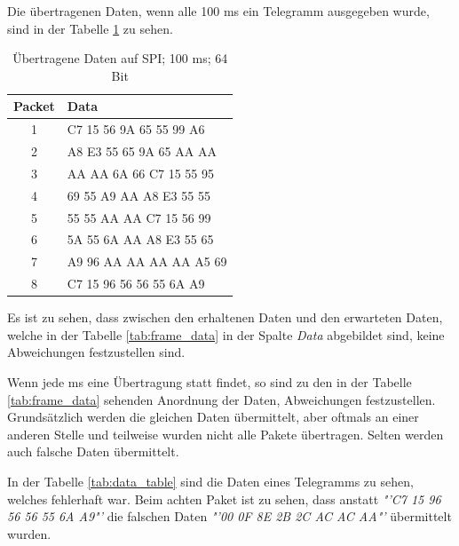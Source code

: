 Die übertragenen Daten, wenn alle 100 ms ein Telegramm ausgegeben wurde, sind in der Tabelle \ref{tab:packet_data_2cols} zu sehen. 

\begin{table}[H]
    \centering
    \begin{tabular}{c||l}
        \toprule
        \textbf{Packet} & \textbf{Data} \\ 
        \midrule
        1 & C7 15 56 9A 65 55 99 A6 \\
        2 & A8 E3 55 65 9A 65 AA AA \\
        3 & AA AA 6A 66 C7 15 55 95 \\
        4 & 69 55 A9 AA A8 E3 55 55 \\
        5 & 55 55 AA AA C7 15 56 99 \\
        6 & 5A 55 6A AA A8 E3 55 65 \\
        7 & A9 96 AA AA AA AA A5 69 \\
        8 & C7 15 96 56 56 55 6A A9 \\
        \bottomrule
    \end{tabular}
    \caption{Übertragene Daten auf SPI; 100 ms; 64 Bit}
    \label{tab:packet_data_2cols}
\end{table}

Es ist zu sehen, dass zwischen den erhaltenen Daten und den erwarteten Daten, welche in der Tabelle \ref{tab:frame_data} in der Spalte \textit{Data} abgebildet sind, keine Abweichungen festzustellen sind.

Wenn jede ms eine Übertragung statt findet, so sind zu den in der Tabelle \ref{tab:frame_data} sehenden Anordnung der Daten, Abweichungen festzustellen. Grundsätzlich werden die gleichen Daten übermittelt, aber oftmals an einer anderen Stelle und teilweise wurden nicht alle Pakete übertragen. Selten werden auch falsche Daten übermittelt.

In der Tabelle \ref{tab:data_table} sind die Daten eines Telegramms zu sehen, welches fehlerhaft war. Beim achten Paket ist zu sehen, dass anstatt \textit{"'C7 15 96 56 56 55 6A A9"'} die falschen Daten \textit{"'00 0F 8E 2B 2C AC AC AA"'} übermittelt wurden.

